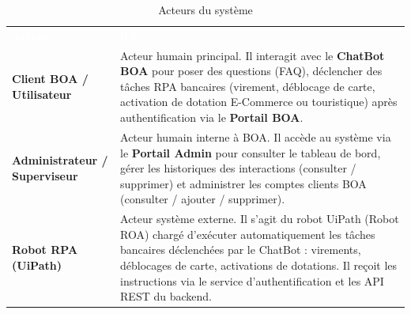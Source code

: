 \begin{table}[h!]
  \centering
  \renewcommand{\arraystretch}{1.6}   %
  \setlength{\tabcolsep}{10pt}

  \begin{tabularx}{\textwidth}{
      >{\bfseries}p{4.5cm}   %
      X                       %
    }

    \rowcolor{boaGreen}
    \textcolor{white}{Acteur} & \textcolor{white}{Rôle} \\

    \rowcolor{boaGray}
    Client BOA / Utilisateur
    &
    Acteur humain principal. Il interagit avec le \textbf{ChatBot BOA}
    pour poser des questions (FAQ), déclencher des tâches RPA bancaires
    (virement, déblocage de carte, activation de dotation E-Commerce
    ou touristique) après authentification via le \textbf{Portail BOA}.
    \\

    \rowcolor{boaLightGreen}
    Administrateur / Superviseur
    &
    Acteur humain interne à BOA. Il accède au système via
    le \textbf{Portail Admin} pour consulter le tableau de bord,
    gérer les historiques des interactions (consulter / supprimer)
    et administrer les comptes clients BOA
    (consulter / ajouter / supprimer).
    \\

    \rowcolor{boaGray}
    Robot RPA (UiPath)
    &
    Acteur système externe. Il s'agit du robot UiPath (Robot ROA)
    chargé d'exécuter automatiquement les tâches bancaires déclenchées
    par le ChatBot : virements, déblocages de carte, activations
    de dotations. Il reçoit les instructions via le service
    d'authentification et les API REST du backend.
    \\

  \end{tabularx}

  \caption{Acteurs du système}
  \label{tab:acteurs}
\end{table}
